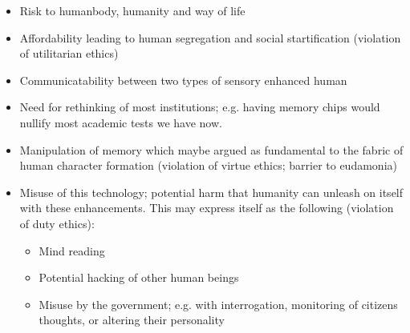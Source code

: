 \begin{itemize}
	\item Risk to humanbody, humanity and way of life
	\item Affordability leading to human segregation and social startification (violation of utilitarian ethics)
	\item Communicatability between two types of sensory enhanced human
	\item Need for rethinking of most institutions; e.g. having memory chips would nullify most academic tests we have now.
	\item Manipulation of memory which maybe argued as fundamental to the fabric of human character formation (violation of virtue ethics; barrier to eudamonia)
	\item Misuse of this technology; potential harm that humanity can unleash on itself with these enhancements. This may express itself as the following (violation of duty ethics):
	\begin{itemize}
		\item Mind reading
		\item Potential hacking of other human beings
		\item Misuse by the government; e.g. with interrogation, monitoring of citizens thoughts, or altering their personality
	\end{itemize}
\end{itemize}